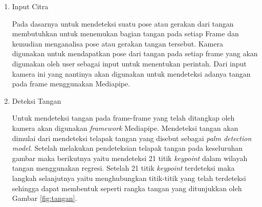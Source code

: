 \begin{enumerate}
\begin{enumerate}
  \item Input Citra \par
  Pada dasarnya untuk mendeteksi suatu pose atau gerakan dari tangan membutuhkan untuk menemukan bagian tangan pada setiap Frame dan kemudian menganalisa pose atau gerakan tangan tersebut. Kamera digunakan untuk mendapatkan pose dari tangan pada setiap frame yang akan digunakan oleh user sebagai input untuk menentukan perintah. Dari input kamera ini yang nantinya akan digunakan untuk mendeteksi adanya tangan pada frame menggunakan Mediapipe.
  \item Deteksi Tangan \par
  Untuk mendeteksi tangan pada frame-frame yang telah ditangkap oleh kamera akan digunakan \textit{framework} Mediapipe. Mendeteksi tangan akan dimulai dari mendeteksi telapak tangan yang disebut sebagai \textit{palm detection model}. Setelah melakukan pendeteksian telapak tangan pada keseluruhan gambar maka berikutnya yaitu mendeteksi 21 titik \textit{keypoint} dalam wilayah tangan menggunakan regresi. Setelah 21 titik \textit{keypoint} terdeteksi maka langkah selanjutnya yaitu menghubungkan titik-titik yang telah terdeteksi sehingga dapat membentuk seperti rangka tangan yang ditunjukkan oleh Gambar \ref*{fig:tangan}.


\end{enumerate}
\end{enumerate}
